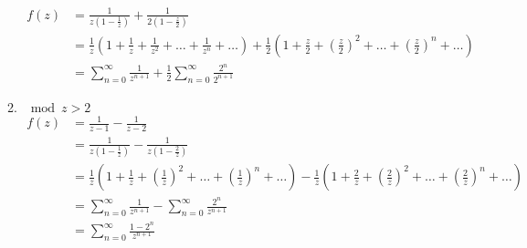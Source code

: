 \documentclass[12pt]{article}
\begin{document}
\begin{itemize}
\begin{enumerate}
$$ \begin{aligned} f(z) &= \frac{1}{z(1 - \frac{1}{z})} + \frac{1}{2(1 - \frac{z}{2})} \\ &= \frac{1}{z}( 1 + \frac{1}{z} + \frac{1}{z^2} + \dots + \frac{1}{z^n} + \dots ) + \frac{1}{2}(1 + \frac{z}{2} + (\frac{z}{2})^2 + \dots + (\frac{z}{2})^n + \dots) \\ &= \sum_{n=0}^\infty \frac{1}{z^{n+1}} + \frac{1}{2}\sum_{n=0}^\infty \frac{2^n}{2^{n+1}} \end{aligned} $$ 
\item $\mod{z} > 2$ 
$$ \begin{aligned} f(z) &= \frac{1}{z-1} - \frac{1}{z-2} \\ &= \frac{1}{z(1 - \frac{1}{z})} - \frac{1}{z(1 - \frac{2}{z})} \\ &= \frac{1}{z}(1 + \frac{1}{z} + (\frac{1}{z})^2 + \dots + (\frac{1}{z})^n + \dots ) - \frac{1}{z}(1 + \frac{2}{z} + (\frac{2}{z})^2 + \dots + (\frac{2}{z})^n + \dots ) \\ &= \sum_{n=0}^\infty \frac{1}{z^{n+1}} - \sum_{n=0}^\infty \frac{2^n}{z^{n+1}} \\ &= \sum_{n=0}^\infty \frac{1-2^n}{z^{n+1}} \end{aligned} $$ 
\end{enumerate} 
 \end{itemize} 
\end{document}
